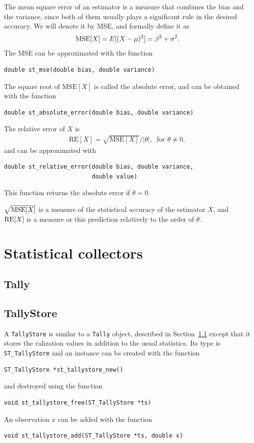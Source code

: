 The mean square error of an estimator is a
measure that combines the bias and the variance, since both of them usually
plays a significant rule in the desired accuracy.
We will denote it by MSE, and formally define it as
\[
\mbox{MSE}[X] = E[(X-\mu)^2] = \beta^2 + \sigma^2.
\]
The MSE can be approximated with the function
\begin{verbatim}
double st_mse(double bias, double variance)
\end{verbatim}
The square root of $\mbox{MSE}[X]$ is called the absolute
error, and can be obtained with the function
\begin{verbatim}
double st_absolute_error(double bias, double variance)
\end{verbatim}
The relative error of $X$ is
\begin{eqnarray*}
 \mbox{RE}[X] = \sqrt{\mbox{MSE}[X]}/|\theta|, \ \mbox{ for } \theta
 \not= 0,
\end{eqnarray*}
and can be approximated with
\begin{verbatim}
double st_relative_error(double bias, double variance,
                         double value)
\end{verbatim}
This function returns the absolute error if $\theta = 0$.

$\sqrt{\mbox{MSE}[X]}$ is a measure of the statistical accuracy of the
estimator $X$, and $\mbox{RE}[X]$ is a measure or this prediction relatively
to the order of $\theta$.

\section{Statistical collectors}

\subsection{Tally}
\label{sec:tally}

\subsection{TallyStore}

A \verb|TallyStore| is similar to a \verb|Tally| object, described in Section~\ref{sec:tally} except that it stores the ralization values in addition to the usual statistics. Its type is \verb|ST_TallyStore| and an instance can be created with the function
\begin{verbatim}
ST_TallyStore *st_tallystore_new()
\end{verbatim}
and destroyed using the function
\begin{verbatim}
void st_tallystore_free(ST_TallyStore *ts)
\end{verbatim}
An observation $x$ can be added with the function
\begin{verbatim}
void st_tallystore_add(ST_TallyStore *ts, double x)
\end{verbatim}

